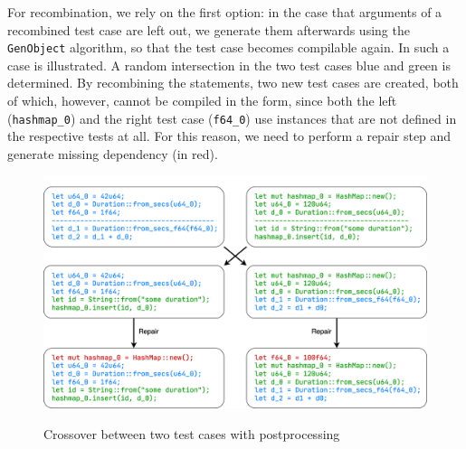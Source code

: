 \documentclass[paper=a4,%
  twoside,%
  BCOR4mm,%
  abstract=true,%
  toc=bibliography,%
  chapterprefix=true,%
  toc=bibliographynumbered,%
  open=right,%
  english,%
  pagesize=pdftex]{scrreprt}
\begin{document}

For recombination, we rely on the first option: in the case that arguments of a recombined test case are left out, we generate them afterwards using the \texttt{GenObject} algorithm, so that the test case becomes compilable again. In  such a case is illustrated. A random intersection in the two test cases blue and green is determined. By recombining the statements, two new test cases are created, both of which, however, cannot be compiled in the form, since both the left (\texttt{hashmap\string_0}) and the right test case (\texttt{f64\string_0}) use instances that are not defined in the respective tests at all. For this reason, we need to perform a repair step and generate missing dependency (in red).

\begin{figure}[h]
\caption{Crossover between two test cases with postprocessing}
\centering
\includegraphics[width=\textwidth]{crossover}
\label{fig:crossover-example}
\end{figure}
\end{document}
